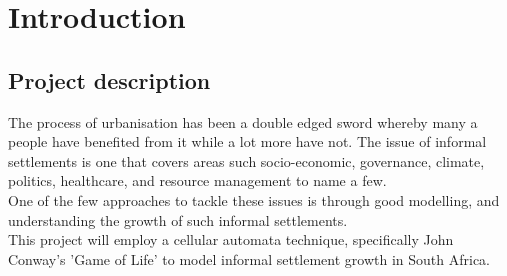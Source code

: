 
\chapter{Introduction} %

\label{Chapter1} %


\newcommand{\keyword}[1]{\textbf{#1}}
\newcommand{\tabhead}[1]{\textbf{#1}}
\newcommand{\code}[1]{\texttt{#1}}
\newcommand{\file}[1]{\texttt{\bfseries#1}}
\newcommand{\option}[1]{\texttt{\itshape#1}}


\section{Project description}
The process of urbanisation has been a double edged sword whereby many a people have benefited from it while a lot more have not. The issue of informal settlements is one that covers areas such socio-economic, governance, climate, politics, healthcare, and resource management to name a few.\\
One of the few approaches to tackle these issues is through good modelling, and understanding the growth of such informal settlements.\\
This project will employ a cellular automata technique, specifically John Conway's 'Game of Life' to model informal settlement growth in South Africa.
